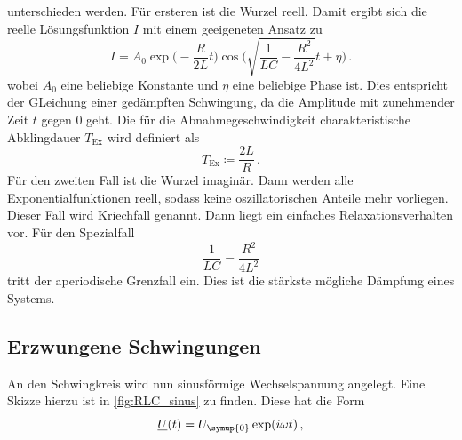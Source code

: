 unterschieden werden. Für ersteren ist die Wurzel reell. Damit ergibt sich die
reelle Lösungsfunktion $I$ mit einem geeigeneten Ansatz zu
\begin{equation}
  I=A_{\text{0}}\exp\biggl(-\frac{R}{2L}t\biggr)\cos\Biggl(
  \sqrt{\frac{1}{LC}-\frac{R^2}{4L^2}}t+\eta\Biggr)\,.
\end{equation}
wobei $A_{\text{0}}$ eine beliebige Konstante und $\eta$ eine beliebige Phase ist.
Dies entspricht der GLeichung einer gedämpften Schwingung, da die Amplitude mit zunehmender
Zeit $t$ gegen $0$ geht.
Die für die Abnahmegeschwindigkeit charakteristische Abklingdauer $T_{\text{Ex}}$
wird definiert als
\begin{equation}
  T_{\text{Ex}}\coloneq\frac{2L}{R} \,.
  \label{eqn:abklingdauer}
\end{equation}
Für den zweiten Fall ist die Wurzel imaginär. Dann werden alle Exponentialfunktionen
reell, sodass keine oszillatorischen Anteile mehr vorliegen. Dieser Fall wird
Kriechfall genannt. Dann liegt ein einfaches Relaxationsverhalten vor.
Für den Spezialfall
\begin{equation}
  \frac{1}{LC}=\frac{R^2}{4L^2}
\end{equation}
tritt der aperiodische Grenzfall ein. Dies ist die stärkste mögliche Dämpfung eines
Systems.

\subsection{Erzwungene Schwingungen}
\label{Erzwungene_Schwingungen}

An den Schwingkreis wird nun sinusförmige Wechselspannung angelegt. Eine Skizze
hierzu ist in \ref{fig:RLC_sinus} zu finden. Diese hat die Form
\begin{equation}
  \underline{U}(t)=U_{\symup{0}}\exp(i\omega t) \,,
\end{equation}

